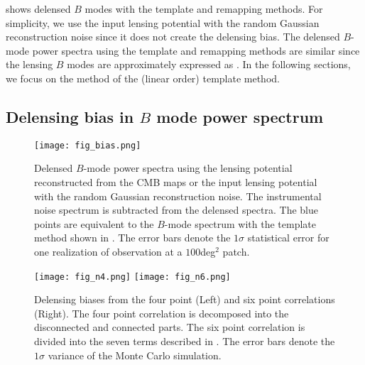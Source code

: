 \documentclass[aps,prd,twocolumn,superscriptaddress,groupedaddress,nofootinbib]{revtex4}
\begin{document}
 shows delensed $B$ modes with the template and remapping methods. 
For simplicity, we use the input lensing potential with the random Gaussian reconstruction noise 
since it does not create the delensing bias. 
The delensed $B$-mode power spectra using the template and remapping methods are similar 
since the lensing $B$ modes are approximately expressed as  \cite{Challinor:2005jy}. 
In the following sections, we focus on the method of the (linear order) template method. 

\subsection{Delensing bias in $B$ mode power spectrum}

\begin{figure}[t]
\bc
\texttt{[image: fig\_bias.png]} 
\caption{
Delensed $B$-mode power spectra using the lensing potential reconstructed from the CMB maps 
or the input lensing potential with the random Gaussian reconstruction noise.
The instrumental noise spectrum is subtracted from the delensed spectra. 
The blue points are equivalent to the $B$-mode spectrum with the template method shown in . 
The error bars denote the $1\sigma$ statistical error for one realization of observation at a $100$deg$^2$ patch. 
}
\label{fig:del}
\ec
\end{figure}

\begin{figure*}[t]
\bc
\texttt{[image: fig\_n4.png]} 
\texttt{[image: fig\_n6.png]} 
\caption{
Delensing biases from the four point (Left) and six point correlations (Right). 
The four point correlation is decomposed into the disconnected and connected parts. 
The six point correlation is divided into the seven terms described in . 
The error bars denote the $1\sigma$ variance of the Monte Carlo simulation.  
}
\label{fig:contrib}
\ec
\end{figure*}
\end{document}
